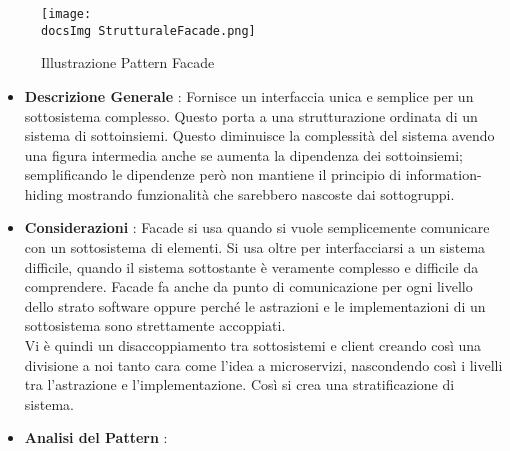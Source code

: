 {{{			\begin{figure}[H]
				\centering
				\texttt{[image: \\docsImg StrutturaleFacade.png]}
				\caption{Illustrazione Pattern Facade}
				\label{Illustrazione Pattern Facade}
			\end{figure}
			
			\begin{itemize}\itemsep1pt
				\item \textbf{Descrizione Generale} : Fornisce un interfaccia unica e semplice per un sottosistema complesso. Questo porta a una strutturazione ordinata di un sistema di sottoinsiemi. Questo diminuisce la complessità del sistema avendo una figura intermedia anche se aumenta la dipendenza dei sottoinsiemi; semplificando le dipendenze però non mantiene il principio di information-hiding mostrando funzionalità che sarebbero nascoste dai sottogruppi.
				\item \textbf{Considerazioni} : Facade si usa quando si vuole semplicemente comunicare con un sottosistema di elementi. Si usa oltre per interfacciarsi a un sistema difficile, quando il sistema sottostante è veramente complesso e difficile da comprendere. Facade fa anche da punto di comunicazione per ogni livello dello strato software oppure perché le astrazioni e le implementazioni di un sottosistema sono strettamente accoppiati.\\
				Vi è quindi un disaccoppiamento tra sottosistemi e client creando così una divisione a noi tanto cara come l'idea a microservizi, nascondendo così i livelli tra l'astrazione e l'implementazione. Così si crea una stratificazione di sistema.
				\item \textbf{Analisi del Pattern} : \hfill
				

\end{itemize}}}}
